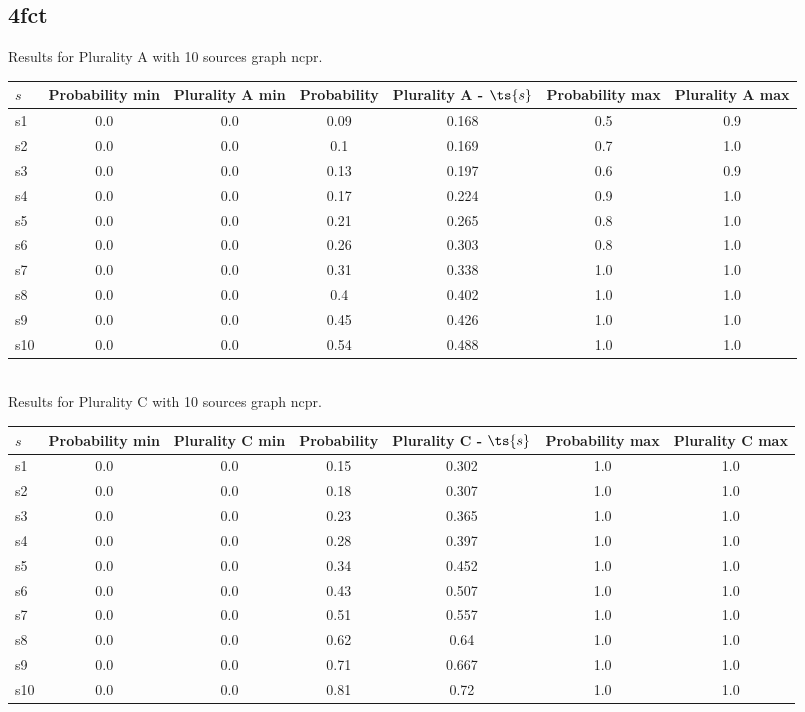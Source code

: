 \documentclass{article}
\begin{document}
\newpage

\subsection{4fct}

\noindent Results for Plurality A with 10 sources graph ncpr.

\noindent\begin{tabular}{|l|c|c|c|c|c|c|}
\hline
$s$& Probability min & Plurality A min & Probability & Plurality A - $\ts{s}$ & Probability max & Plurality A max\\
\hline
s1 &0.0 & 0.0 & 0.09 & 0.168 & 0.5 & 0.9\\
\hline
s2 &0.0 & 0.0 & 0.1 & 0.169 & 0.7 & 1.0\\
\hline
s3 &0.0 & 0.0 & 0.13 & 0.197 & 0.6 & 0.9\\
\hline
s4 &0.0 & 0.0 & 0.17 & 0.224 & 0.9 & 1.0\\
\hline
s5 &0.0 & 0.0 & 0.21 & 0.265 & 0.8 & 1.0\\
\hline
s6 &0.0 & 0.0 & 0.26 & 0.303 & 0.8 & 1.0\\
\hline
s7 &0.0 & 0.0 & 0.31 & 0.338 & 1.0 & 1.0\\
\hline
s8 &0.0 & 0.0 & 0.4 & 0.402 & 1.0 & 1.0\\
\hline
s9 &0.0 & 0.0 & 0.45 & 0.426 & 1.0 & 1.0\\
\hline
s10 &0.0 & 0.0 & 0.54 & 0.488 & 1.0 & 1.0\\
\hline
\end{tabular}\\

\noindent Results for Plurality C with 10 sources graph ncpr.

\noindent\begin{tabular}{|l|c|c|c|c|c|c|}
\hline
$s$& Probability min & Plurality C min & Probability & Plurality C - $\ts{s}$ & Probability max & Plurality C max\\
\hline
s1 &0.0 & 0.0 & 0.15 & 0.302 & 1.0 & 1.0\\
\hline
s2 &0.0 & 0.0 & 0.18 & 0.307 & 1.0 & 1.0\\
\hline
s3 &0.0 & 0.0 & 0.23 & 0.365 & 1.0 & 1.0\\
\hline
s4 &0.0 & 0.0 & 0.28 & 0.397 & 1.0 & 1.0\\
\hline
s5 &0.0 & 0.0 & 0.34 & 0.452 & 1.0 & 1.0\\
\hline
s6 &0.0 & 0.0 & 0.43 & 0.507 & 1.0 & 1.0\\
\hline
s7 &0.0 & 0.0 & 0.51 & 0.557 & 1.0 & 1.0\\
\hline
s8 &0.0 & 0.0 & 0.62 & 0.64 & 1.0 & 1.0\\
\hline
s9 &0.0 & 0.0 & 0.71 & 0.667 & 1.0 & 1.0\\
\hline
s10 &0.0 & 0.0 & 0.81 & 0.72 & 1.0 & 1.0\\
\hline
\end{tabular}\\
\end{document}
